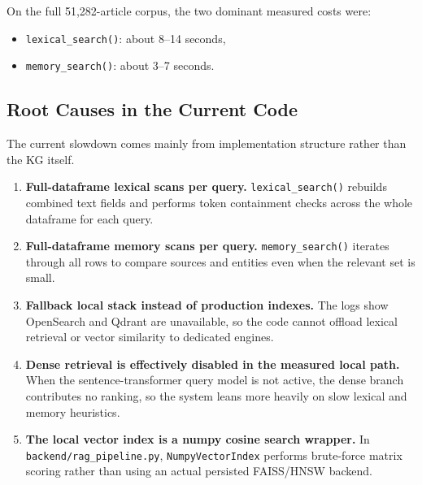 \documentclass[12pt]{article}
\begin{document}
On the full 51,282-article corpus, the two dominant measured costs were:
\begin{itemize}[leftmargin=1.5em]
  \item \texttt{lexical\_search()}: about 8--14 seconds,
  \item \texttt{memory\_search()}: about 3--7 seconds.
\end{itemize}

\subsection{Root Causes in the Current Code}
The current slowdown comes mainly from implementation structure rather than the KG itself.

\begin{enumerate}[leftmargin=1.5em]
  \item \textbf{Full-dataframe lexical scans per query.}
  \texttt{lexical\_search()} rebuilds combined text fields and performs token containment checks across the whole dataframe for each query.

  \item \textbf{Full-dataframe memory scans per query.}
  \texttt{memory\_search()} iterates through all rows to compare sources and entities even when the relevant set is small.

  \item \textbf{Fallback local stack instead of production indexes.}
  The logs show OpenSearch and Qdrant are unavailable, so the code cannot offload lexical retrieval or vector similarity to dedicated engines.

  \item \textbf{Dense retrieval is effectively disabled in the measured local path.}
  When the sentence-transformer query model is not active, the dense branch contributes no ranking, so the system leans more heavily on slow lexical and memory heuristics.

  \item \textbf{The local vector index is a numpy cosine search wrapper.}
  In \texttt{backend/rag\_pipeline.py}, \texttt{NumpyVectorIndex} performs brute-force matrix scoring rather than using an actual persisted FAISS/HNSW backend.
\end{enumerate}
\end{document}

